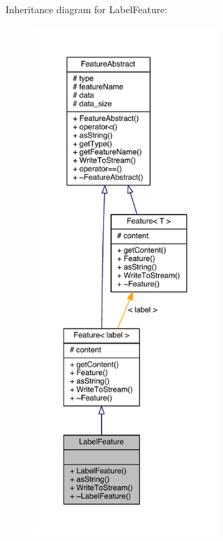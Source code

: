 Inheritance diagram for Label\+Feature\+:\nopagebreak
\begin{figure}[H]
\begin{center}
\leavevmode
\includegraphics[height=550pt]{class_label_feature__inherit__graph}
\end{center}
\end{figure}


